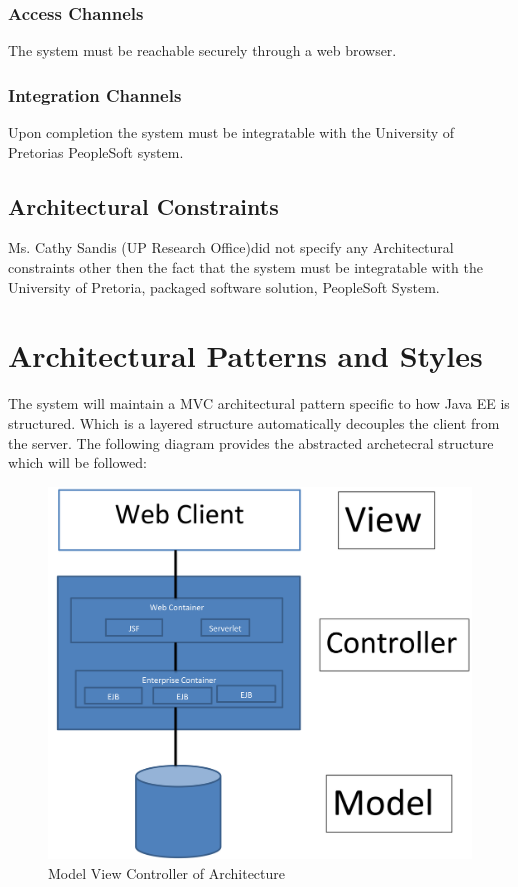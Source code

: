 \documentclass[12pt]{article}
\newcommand{\client}{Ms. Cathy Sandis (UP Research Office)}
\begin{document}
\subsubsection{Access Channels}
The system must be reachable securely through a web browser. 

\subsubsection{Integration Channels}
Upon completion the system must be integratable with the University of Pretorias PeopleSoft system.

\subsection{Architectural Constraints}
\client did not specify any Architectural constraints other then the fact that the system must be integratable with the University of Pretoria, packaged software solution, PeopleSoft System. 

\section{Architectural Patterns and Styles} %
The system will maintain a MVC architectural pattern specific to how Java EE is structured. Which is a layered structure automatically decouples the client from the server. The following diagram provides the abstracted archetecral structure which will be followed:
\begin{figure}
\includegraphics[scale=0.2]{../Images_Docs/Diagrams/Architecture/MVC.jpg}
\caption{Model View Controller of Architecture}
\end{figure}
\end{document}
